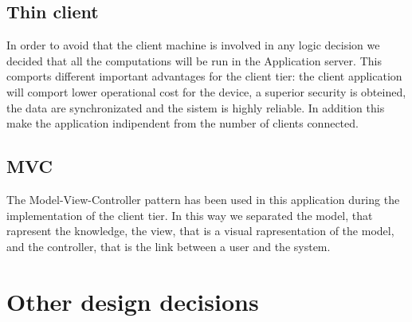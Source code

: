 \subsection{Thin client}
	In order to avoid that the client machine is involved in any logic decision we decided that all the computations will be run in the Application server. This comports different important advantages for the client tier: the client application will comport lower operational cost for the device, a superior security is obteined, the data are synchronizated and the sistem is highly reliable. In addition this make the application indipendent from the number of clients connected.
\subsection{MVC}
	The Model-View-Controller pattern has been used in this application during the implementation of the client tier. In this way we separated the model, that rapresent the knowledge, the view, that is a visual rapresentation of the model, and the controller, that is the link between a user and the system.

 \section{Other design decisions}
 	\blindtext